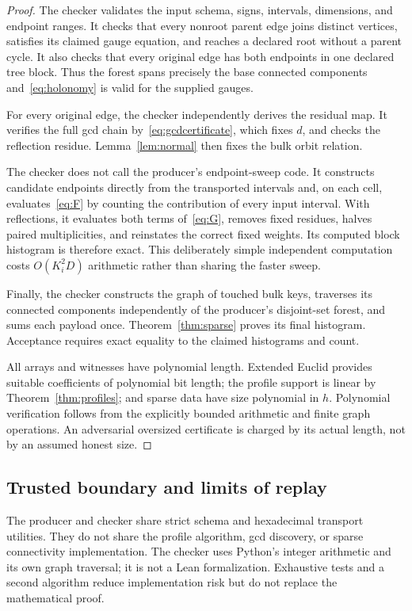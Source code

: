 \documentclass[11pt]{article}
\theoremstyle{definition}
\begin{document}
\begin{proof}
The checker validates the input schema, signs, intervals, dimensions, and endpoint ranges. It checks that every nonroot parent edge joins distinct vertices, satisfies its claimed gauge equation, and reaches a declared root without a parent cycle. It also checks that every original edge has both endpoints in one declared tree block. Thus the forest spans precisely the base connected components and~\eqref{eq:holonomy} is valid for the supplied gauges.

For every original edge, the checker independently derives the residual map. It verifies the full gcd chain by~\eqref{eq:gcdcertificate}, which fixes $d$, and checks the reflection residue. Lemma~\ref{lem:normal} then fixes the bulk orbit relation.

The checker does not call the producer's endpoint-sweep code. It constructs candidate endpoints directly from the transported intervals and, on each cell, evaluates~\eqref{eq:F} by counting the contribution of every input interval. With reflections, it evaluates both terms of~\eqref{eq:G}, removes fixed residues, halves paired multiplicities, and reinstates the correct fixed weights. Its computed block histogram is therefore exact. This deliberately simple independent computation costs $O(K_i^2D)$ arithmetic rather than sharing the faster sweep.

Finally, the checker constructs the graph of touched bulk keys, traverses its connected components independently of the producer's disjoint-set forest, and sums each payload once. Theorem~\ref{thm:sparse} proves its final histogram. Acceptance requires exact equality to the claimed histograms and count.

All arrays and witnesses have polynomial length. Extended Euclid provides suitable coefficients of polynomial bit length; the profile support is linear by Theorem~\ref{thm:profiles}; and sparse data have size polynomial in $h$. Polynomial verification follows from the explicitly bounded arithmetic and finite graph operations. An adversarial oversized certificate is charged by its actual length, not by an assumed honest size.
\end{proof}

\subsection{Trusted boundary and limits of replay}
The producer and checker share strict schema and hexadecimal transport utilities. They do not share the profile algorithm, gcd discovery, or sparse connectivity implementation. The checker uses Python's integer arithmetic and its own graph traversal; it is not a Lean formalization. Exhaustive tests and a second algorithm reduce implementation risk but do not replace the mathematical proof.
\end{document}
